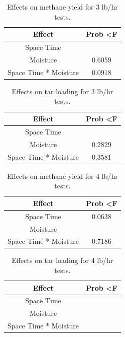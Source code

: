 \documentclass[11pt,twocolumn]{article}
\begin{document}
\begin{table}
	\centering
	\caption{Effects on methane yield for 3 lb/hr tests.}
	\label{tar2}
	\begin{tabular}{c c}
	Effect				&	Prob \textless F	\\
	\hline
	Space Time			&	\color{red}{\textless 0.0001} \\
	Moisture				&	0.6059 \\
	Space Time * Moisture	&	0.0918 \\
	\end{tabular}
\end{table}

\begin{table}
	\centering
	\caption{Effects on tar loading for 3 lb/hr tests.}
	\label{tar3}
	\begin{tabular}{c c}
	Effect				&	Prob \textless F	\\
	\hline
	Space Time			&	\color{red}{\textless0.0001} \\
	Moisture				&	0.2829 \\
	Space Time * Moisture	&	0.3581 \\
	\end{tabular}
\end{table}

\begin{table}
	\centering
	\caption{Effects on methane yield for 4 lb/hr tests.}
	\label{tar4}
	\begin{tabular}{c c}
	Effect				&	Prob \textless F	\\
	\hline
	Space Time			&	0.0638 \\
	Moisture				&	\color{red}{0.0277} \\
	Space Time * Moisture	&	0.7186 \\
	\end{tabular}
\end{table}

\begin{table}
	\centering
	\caption{Effects on tar loading for 4 lb/hr tests.}
	\label{tar4}
	\begin{tabular}{c c}
	Effect				&	Prob \textless F	\\
	\hline
	Space Time			&	\color{red}{0.0024} \\
	Moisture				&	\color{red}{ 0.0110} \\
	Space Time * Moisture	&	\color{red}{0.0170}  \\
	\end{tabular}
\end{table}
\end{document}

